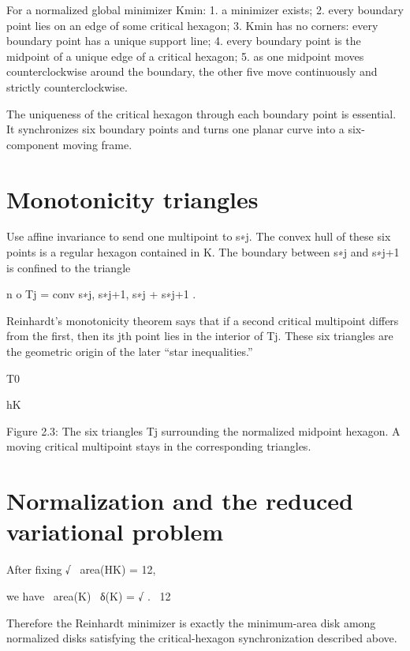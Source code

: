For a normalized global minimizer Kmin: 1. a minimizer exists; 2. every boundary point lies on an edge of some critical hexagon; 3. Kmin has no corners: every boundary point has a unique support line; 4. every boundary point is the midpoint of a unique edge of a critical hexagon; 5. as one midpoint moves counterclockwise around the boundary, the other five move continuously and strictly counterclockwise.


The uniqueness of the critical hexagon through each boundary point is essential. It synchronizes six boundary points and turns one planar curve into a six-component moving frame.


\section{Monotonicity triangles}

Use affine invariance to send one multipoint to s∗j. The convex hull of these six points is a regular hexagon contained in K. The boundary between s∗j and s∗j+1 is confined to the triangle


n o Tj = conv s∗j, s∗j+1, s∗j + s∗j+1 .


Reinhardt’s monotonicity theorem says that if a second critical multipoint differs from the first, then its jth point lies in the interior of Tj. These six triangles are the geometric origin of the later “star inequalities.”


T0


hK


\begin{figureplaceholder}
Figure 2.3: The six triangles Tj surrounding the normalized midpoint hexagon. A moving critical multipoint stays in the corresponding triangles.
\end{figureplaceholder}

\section{Normalization and the reduced variational problem}

\begin{displaytext}
After fixing √ \
area(HK) = 12,
\end{displaytext}

\begin{displaytext}
we have \
area(K) \
δ(K) = √ . \
12
\end{displaytext}

Therefore the Reinhardt minimizer is exactly the minimum-area disk among normalized disks satisfying the critical-hexagon synchronization described above.


